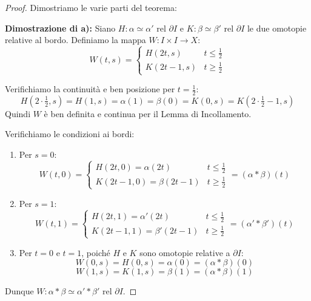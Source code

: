 \begin{proof}
Dimostriamo le varie parti del teorema:

\textbf{Dimostrazione di a):}
Siano $H: \alpha \simeq \alpha' \text{ rel } \partial I$ e $K: \beta \simeq \beta' \text{ rel } \partial I$ le due omotopie relative al bordo. Definiamo la mappa $W: I \times I \to X$:
\[
W(t,s) = 
\begin{cases}
    H(2t, s) & t \leqslant \frac{1}{2} \\
    K(2t-1, s) & t \geqslant \frac{1}{2}
\end{cases}
\]

Verifichiamo la continuità e ben posizione per $t = \frac{1}{2}$:
\[
H(2 \cdot \tfrac{1}{2}, s) = H(1, s) = \alpha(1) = \beta(0) = K(0, s) = K(2 \cdot \tfrac{1}{2} - 1, s)
\]
Quindi $W$ è ben definita e continua per il Lemma di Incollamento.

Verifichiamo le condizioni ai bordi:
\begin{enumerate}[label=\roman*)]
    \item Per $s = 0$:
    \[
    W(t,0) = 
    \begin{cases}
        H(2t,0) = \alpha(2t) & t \leqslant \frac{1}{2} \\
        K(2t-1,0) = \beta(2t-1) & t \geqslant \frac{1}{2}
    \end{cases}
    = (\alpha * \beta)(t)
    \]
    \item Per $s = 1$:
    \[
    W(t,1) = 
    \begin{cases}
        H(2t,1) = \alpha'(2t) & t \leqslant \frac{1}{2} \\
        K(2t-1,1) = \beta'(2t-1) & t \geqslant \frac{1}{2}
    \end{cases}
    = (\alpha' * \beta')(t)
    \]
    \item Per $t = 0$ e $t = 1$, poiché $H$ e $K$ sono omotopie relative a $\partial I$:
    \[
    W(0,s) = H(0,s) = \alpha(0) = (\alpha * \beta)(0)
    \]
    \[
    W(1,s) = K(1,s) = \beta(1) = (\alpha * \beta)(1)
    \]
\end{enumerate}
Dunque $W: \alpha * \beta \simeq \alpha' * \beta' \text{ rel } \partial I$.

\vspace{1em}


\end{proof}
